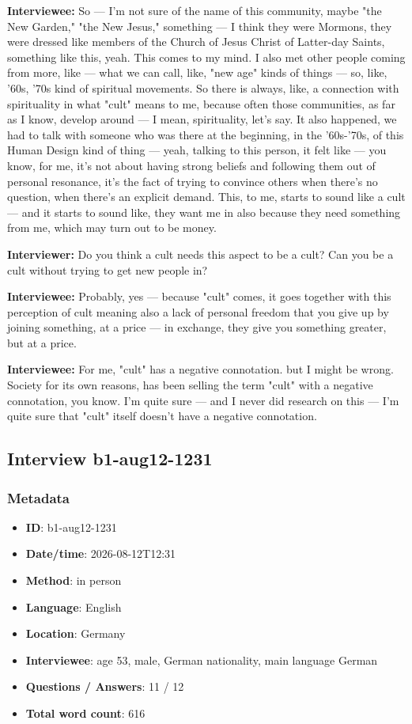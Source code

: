 \textbf{Interviewee:} So — I'm not sure of the name of this community, maybe "the New Garden," "the New Jesus," something — I think they were Mormons, they were dressed like members of the Church of Jesus Christ of Latter-day Saints, something like this, yeah. This comes to my mind. I also met other people coming from more, like — what we can call, like, "new age" kinds of things — so, like, '60s, '70s kind of spiritual movements. So there is always, like, a connection with spirituality in what "cult" means to me, because often those communities, as far as I know, develop around — I mean, spirituality, let's say. It also happened, we had to talk with someone who was there at the beginning, in the '60s-'70s, of this Human Design kind of thing — yeah, talking to this person, it felt like — you know, for me, it's not about having strong beliefs and following them out of personal resonance, it's the fact of trying to convince others when there's no question, when there's an explicit demand. This, to me, starts to sound like a cult — and it starts to sound like, they want me in also because they need something from me, which may turn out to be money.

\textbf{Interviewer:} Do you think a cult needs this aspect to be a cult? Can you be a cult without trying to get new people in?

\textbf{Interviewee:} Probably, yes — because "cult" comes, it goes together with this perception of cult meaning also a lack of personal freedom that you give up by joining something, at a price — in exchange, they give you something greater, but at a price.

\textbf{Interviewee:}  For me, "cult" has a negative connotation. but I might be wrong. Society for its own reasons, has been selling the term "cult" with a negative connotation, you know. I'm quite sure — and I never did research on this — I'm quite sure that "cult" itself doesn't have a negative connotation.

\subsection{Interview b1-aug12-1231}\label{int:b1-aug12-1231}
\subsubsection*{Metadata}
\begin{itemize}
  \item \textbf{ID}: b1-aug12-1231
  \item \textbf{Date/time}: 2026-08-12T12:31
  \item \textbf{Method}: in person
  \item \textbf{Language}: English
  \item \textbf{Location}: Germany
  \item \textbf{Interviewee}: age 53, male, German nationality, main language German
  \item \textbf{Questions / Answers}: 11 / 12
  \item \textbf{Total word count}: 616
\end{itemize}
